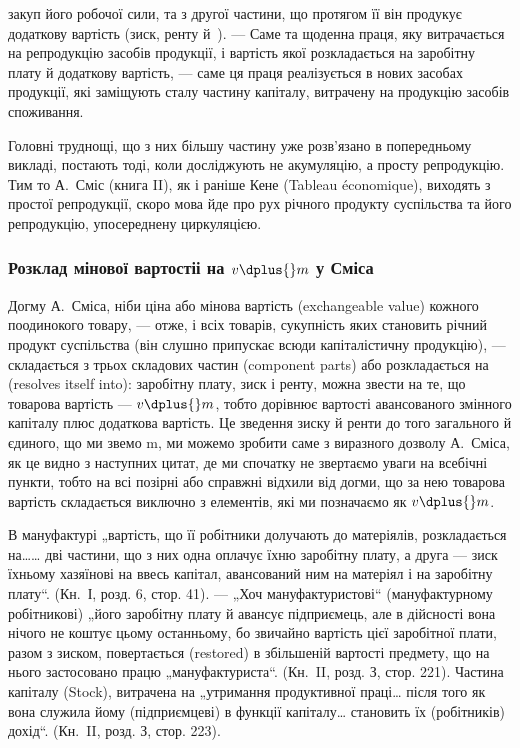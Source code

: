 \parcont{}  %
закуп його робочої сили, та з другої частини, що протягом її він продукує
додаткову вартість (зиск, ренту й~). — Саме та щоденна праця,
яку витрачається на репродукцію засобів продукції, і вартість якої
розкладається на заробітну плату й додаткову вартість, — саме ця праця
реалізується в нових засобах продукції, які заміщують сталу частину
капіталу, витрачену на продукцію засобів споживання.

Головні труднощі, що з них більшу частину уже розв’язано в попередньому
викладі, постають тоді, коли досліджують не акумуляцію, а просту
репродукцію. Тим то А.~Сміс (книга II), як і раніше Кене (Tableau
économique), виходять з простої репродукції, скоро мова йде про рух
річного продукту суспільства та його репродукцію, упосереднену циркуляцією.

\subsubsection{Розклад мінової вартостіі на $v \dplus{} m$ у Сміса}

Догму А.~Сміса, ніби ціна або мінова вартість (exchangeable value)
кожного поодинокого товару, — отже, і всіх товарів, сукупність яких
становить річний продукт суспільства (він слушно припускає всюди капіталістичну
продукцію), — складається з трьох складових частин (component
parts) або розкладається на (resolves itself into): заробітну плату,
зиск і ренту, можна звести на те, що товарова вартість — $v \dplus{} m$, тобто
дорівнює вартості авансованого змінного капіталу плюс додаткова вартість.
Це зведення зиску й ренти до того загального й єдиного, що
ми звемо m, ми можемо зробити саме з виразного дозволу А.~Сміса, як
це видно з наступних цитат, де ми спочатку не звертаємо уваги на всебічні
пункти, тобто на всі позірні або справжні відхили від догми, що за
нею товарова вартість складається виключно з елементів, які ми позначаємо
як $v \dplus{} m$.

В мануфактурі „вартість, що її робітники долучають до матеріялів,
розкладається на\dots{}\dots{} дві частини, що з них одна оплачує їхню заробітну
плату, а друга — зиск їхньому хазяїнові на ввесь капітал, авансований ним
на матеріял і на заробітну плату“. (Кн.~І, розд. 6, стор. 41). — „Хоч
мануфактуристові“ (мануфактурному робітникові) „його заробітну плату
й авансує підприємець, але в дійсності вона нічого не коштує цьому
останньому, бо звичайно вартість цієї заробітної плати, разом з зиском,
повертається (restored) в збільшеній вартості предмету, що на нього застосовано
працю „мануфактуриста“. (Кн.~II, розд. З, стор. 221). Частина капіталу
(Stock), витрачена на „утримання продуктивної праці\dots{} після того як вона
служила йому (підприємцеві) в функції капіталу\dots{} становить їх (робітників)
дохід“. (Кн.~II, розд. З, стор. 223).

